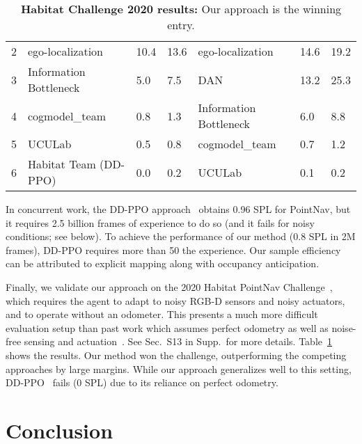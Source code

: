 \documentclass[runningheads]{llncs}
\begin{document}
\begin{table}[!t]
\begin{minipage}{\linewidth}
{\begin{tabular}{@{}clp{1.5cm}p{1.5cm}lp{1.5cm}p{1.5cm}@{}}
    2    & ego-localization~\cite{datta2020egolocalization}           & 10.4   & 13.6       & ego-localization ~\cite{datta2020egolocalization}     & 14.6    & 19.2       \\
    3    & Information Bottleneck                                     & 5.0    & 7.5        & DAN~\cite{karkus2019differentiable}                   & 13.2    & 25.3       \\
    4    & cogmodel\_team                                             & 0.8    & 1.3        & Information Bottleneck                                & 6.0     & 8.8        \\
    5    & UCULab                                                     & 0.5    & 0.8        & cogmodel\_team                                        & 0.7     & 1.2        \\
    6    & Habitat Team (DD-PPO)~\cite{wijmans2019decentralized}      & 0.0    & 0.2        & UCULab                                                & 0.1     & 0.2        \\ \bottomrule
    \end{tabular}
    }
    \caption{\small \textbf{Habitat Challenge 2020 results:} Our approach is the winning entry.}
    \label{tab:habitat_challenge}
\end{minipage}
\end{table}



In concurrent work, the DD-PPO approach~\cite{wijmans2019decentralized} obtains 0.96 SPL for PointNav, but it requires 2.5 billion frames of experience to do so (and it fails for noisy conditions; see below). To achieve the performance of our method (0.8 SPL in 2M frames), DD-PPO requires more than 50 the experience. Our sample efficiency can be attributed to explicit mapping along with occupancy anticipation. 

Finally, we validate our approach on the 2020 Habitat PointNav Challenge~\cite{habitat-challenge}, which requires the agent to adapt to noisy RGB-D sensors and noisy actuators, and to operate without an odometer. This presents a much more difficult evaluation setup than past work which assumes perfect odometry as well as noise-free sensing and actuation~\cite{habitat19iccv,chaplot2020learning,wijmans2019decentralized}. See Sec.~S13 in Supp.~for more details. Table~\ref{tab:habitat_challenge} shows the results.
Our method won the challenge, outperforming the competing approaches by large margins. While our approach generalizes well to this setting, DD-PPO~\cite{wijmans2019decentralized} fails (0 SPL) due to its reliance on perfect odometry. \section{Conclusion}
\end{document}
